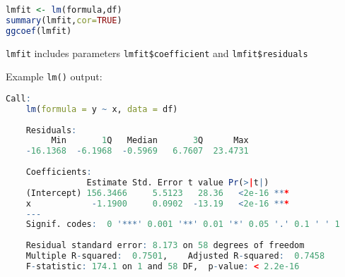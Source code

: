      

\begin{rcode}
\begin{lstlisting}[language=R]
lmfit <- lm(formula,df)
summary(lmfit,cor=TRUE)
ggcoef(lmfit)
\end{lstlisting}

    \lstinline|lmfit| includes parameters \lstinline|lmfit$coefficient| and \lstinline|lmfit$residuals|

    Example \lstinline|lm()| output:
\begin{lstlisting}[language=R]
    Call:
    lm(formula = y ~ x, data = df)
    
    Residuals:
         Min       1Q   Median       3Q      Max 
    -16.1368  -6.1968  -0.5969   6.7607  23.4731 
    
    Coefficients:
                Estimate Std. Error t value Pr(>|t|)    
    (Intercept) 156.3466     5.5123   28.36   <2e-16 ***
    x            -1.1900     0.0902  -13.19   <2e-16 ***
    ---
    Signif. codes:  0 '***' 0.001 '**' 0.01 '*' 0.05 '.' 0.1 ' ' 1
    
    Residual standard error: 8.173 on 58 degrees of freedom
    Multiple R-squared:  0.7501,    Adjusted R-squared:  0.7458 
    F-statistic: 174.1 on 1 and 58 DF,  p-value: < 2.2e-16
\end{lstlisting}

\end{rcode}













